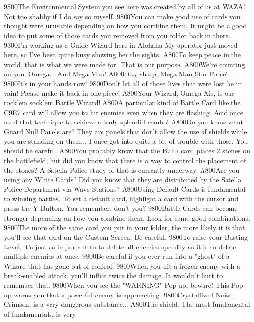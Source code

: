 {98}{00}The Environmental System you see here was created by all of us at WAZA! 
Not too shabby if I do say so myself. 
{98}{00}You can make good use of cards you thought were 
unusable depending on how you combine them. 
It might be a good idea to put some of those cards 
you removed from you folder back in there. 
{93}{00}I'm working as a Guide Wizard here in Alohaha My operator just moved 
here, so I've been quite busy showing her the sights. 
{A8}{00}To keep peace in the world, that is what we were made for. That is our purpose. 
{A8}{00}We're counting on you, Omega... And Mega Man! 
{A8}{00}Stay sharp, Mega Man Star Force! 
{98}{00}It's in your hands now! 
{98}{00}Don't let all of those lives that were lost be in vain! 
Please make it back in one piece! 
{A8}{00}Your Wizard, Omega-Xis, is one rock'em sock'em Battle Wizard! 
{A8}{00}A particular kind of Battle Card like the {C9}{E7} card 
will allow you to hit enemies even when they are flashing. 
Acid once used that technique to achieve a truly splendid combo! 
{A8}{00}Do you know what Guard Null Panels are? They are panels that don't 
allow the use of shields while you are standing on them... 
I once got into quite a bit of trouble with those. 
You should be careful. 
{A8}{00}You probably know that the {B7}{E7} card places 2 stones on the battlefield, 
but did you know that there is a way to control the placement of the stones? 
A Satella Police study of that is currently underway. 
{A8}{00}Are you using any White Cards? Did you know that they are distributed by 
the Satella Police Department via Wave Stations? 
{A8}{00}Using Default Cards is fundamental to winning battles. To set a default 
card, highlight a card with the cursor and press the Y Button. 
You remember, don't you? 
{98}{00}Battle Cards can become stronger depending on how you combine them. 
Look for some good combinations. 
{98}{00}The more of the same card you put in your folder, the 
more likely it is that you'll see that card on the Custom Screen. 
Be careful. 
{98}{00}To raise your Busting Level, it's just as important to to delete all enemies 
speedily as it is to delete multiple enemies at once. 
{98}{00}Be careful if you ever run into a "ghost" of a Wizard 
that has gone out of control. 
{98}{00}When you hit a frozen enemy with a break-enabled attack, 
you'll inflict twice the damage. 
It wouldn't hurt to remember that. 
{98}{00}When you see the "WARNING" Pop-up, beware! This Pop-up warns 
you that a powerful enemy is approaching. 
{98}{00}Crystallized Noise, Crimson, is a very dangerous substance... 
{A8}{00}The shield. The most fundamental of fundamentals, is very 
